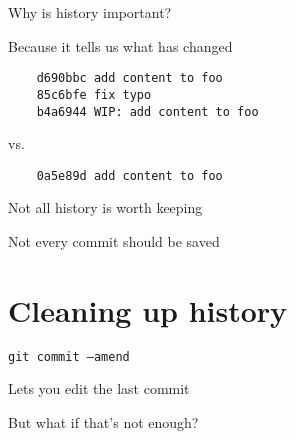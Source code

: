 \documentclass[11pt,xetex]{beamer}
\begin{document}
\begin{frame}{}
  \begin{center}
    \Huge Why is history important?
  \end{center}
\end{frame}

\begin{frame}{}
  \begin{center}
    \Huge Because it tells us what has changed
  \end{center}
\end{frame}

\begin{frame}[fragile]{}
  \begin{verbatim}
    d690bbc add content to foo
    85c6bfe fix typo
    b4a6944 WIP: add content to foo
  \end{verbatim}

  \center \Large vs.

  \normalsize
  \begin{verbatim}
    0a5e89d add content to foo
  \end{verbatim}
\end{frame}

\begin{frame}{}
  \LARGE Not all history is worth keeping
\end{frame}

\begin{frame}{}
  \LARGE Not every commit should be saved
\end{frame}

\section*{Cleaning up history}

\begin{frame}{}
  \begin{center}
    \huge \texttt{git commit --amend}
  \end{center}
\end{frame}

\begin{frame}{}
  \begin{center}
    \huge Lets you edit the last commit
  \end{center}
\end{frame}

\begin{frame}{}
  \begin{center}
    \huge But what if that's not enough?
  \end{center}
\end{frame}
\end{document}
